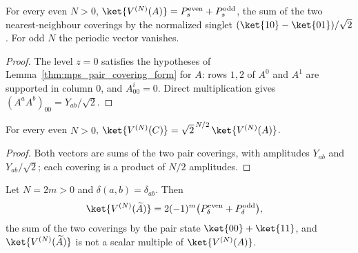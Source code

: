 \begin{lemma}%
    \label{thm:majumdar_ghosh_dimer_superposition}
    \leanok
    For every even $N>0$, $\ket{V^{(N)}(A)}=P^{\mathrm{even}}_s+P^{\mathrm{odd}}_s$,
    the sum of the two nearest-neighbour coverings by the normalized singlet
    $(\ket{10}-\ket{01})/\sqrt2$. For odd $N$ the periodic vector vanishes.
\end{lemma}

\begin{proof}
    \leanok
    The level $z=0$ satisfies the hypotheses of
    Lemma~\ref{thm:mps_pair_covering_form} for $A$: rows $1,2$ of $A^0$ and $A^1$
    are supported in column $0$, and $A^i_{00}=0$. Direct multiplication gives
    $(A^aA^b)_{00}=Y_{ab}/\sqrt2$.
\end{proof}

\begin{lemma}%
    \label{thm:majumdar_ghosh_bond_singlet_scaling}
    \leanok
    For every even $N>0$,
    $\ket{V^{(N)}(C)}=\sqrt2^{\,N/2}\,\ket{V^{(N)}(A)}$.
\end{lemma}

\begin{proof}
    \leanok
    Both vectors are sums of the two pair coverings, with amplitudes $Y_{ab}$
    and $Y_{ab}/\sqrt2$; each covering is a product of $N/2$ amplitudes.
\end{proof}

\begin{lemma}%
    \label{thm:majumdar_ghosh_review_mpv}
    \leanok
    Let $N=2m>0$ and $\delta(a,b)=\delta_{ab}$. Then
    \begin{align}
        \ket{V^{(N)}(\widetilde A)} & =
        2(-1)^m\bigl(P^{\mathrm{even}}_\delta+P^{\mathrm{odd}}_\delta\bigr),
        \label{eq:mg_review_vector}
    \end{align}
    the sum of the two coverings by the pair state $\ket{00}+\ket{11}$, and
    $\ket{V^{(N)}(\widetilde A)}$ is not a scalar multiple of
    $\ket{V^{(N)}(A)}$.
\end{lemma}

